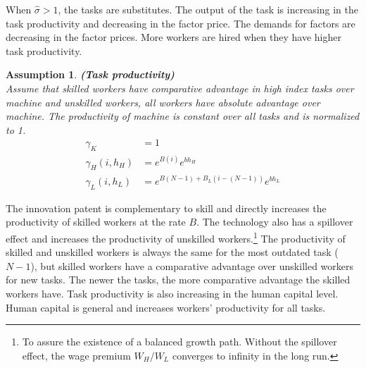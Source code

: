 \documentclass[12pt]{article}
\newtheorem{assumption}{Assumption}
\begin{document}
When $\hat{\sigma}>1$, the tasks are substitutes. The output of the task is increasing in the task productivity and decreasing in the factor price. The demands for factors are decreasing in the factor prices. More workers are hired when they have higher task productivity. 


\begin{assumption}{\bf (Task productivity)} \\

Assume that skilled workers have comparative advantage in high index tasks over machine and unskilled workers, all workers have absolute advantage over machine. The productivity of machine is constant over all tasks and is normalized to 1. 
\begin{align*}
\gamma_K &= 1 \\
\gamma_H(i,h_H) &=e^{B(i)} e^{bh_H} \\
\gamma_L(i,h_L) &= e^{B(N-1)+B_L(i-(N-1))} e^{bh_L}
\end{align*}
\end{assumption}

The innovation patent is complementary to skill and directly increases the productivity of skilled workers at the rate $B$. The technology also has a spillover effect and increases the productivity of unskilled workers.\footnote{To assure the existence of a balanced growth path. Without the spillover effect, the wage premium $W_H/W_L$ converges to infinity in the long run.} The productivity of skilled and unskilled workers is always the same for the most outdated task ($N-1$), but skilled workers have a comparative advantage over unskilled workers for new tasks. The newer the tasks, the more comparative advantage the skilled workers have. Task productivity is also increasing in the human capital level. Human capital is general and increases workers' productivity for all tasks.  
\end{document}
